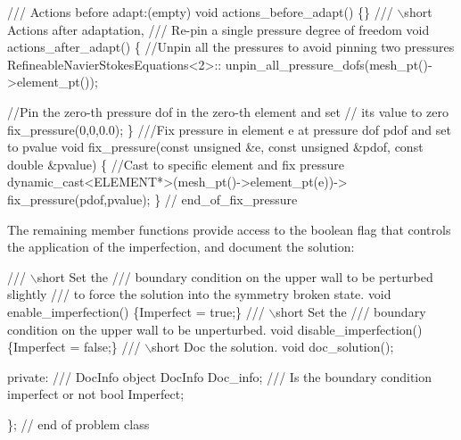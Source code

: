 \begin{DoxyCodeInclude}
\textcolor{comment}{}
\textcolor{comment}{ /// Actions before adapt:(empty)}
\textcolor{comment}{} \textcolor{keywordtype}{void} actions\_before\_adapt() \{\}
\textcolor{comment}{}
\textcolor{comment}{ /// \(\backslash\)short Actions after adaptation,}
\textcolor{comment}{ /// Re-pin a single pressure degree of freedom}
\textcolor{comment}{} \textcolor{keywordtype}{void} actions\_after\_adapt()
  \{
   \textcolor{comment}{//Unpin all the pressures to avoid pinning two pressures}
   RefineableNavierStokesEquations<2>::
    unpin\_all\_pressure\_dofs(mesh\_pt()->element\_pt());

   \textcolor{comment}{//Pin the zero-th pressure dof in the zero-th element and set}
   \textcolor{comment}{// its value to zero}
   fix\_pressure(0,0,0.0);
  \}
\textcolor{comment}{}
\textcolor{comment}{ ///Fix pressure in element e at pressure dof pdof and set to pvalue}
\textcolor{comment}{} \textcolor{keywordtype}{void} fix\_pressure(\textcolor{keyword}{const} \textcolor{keywordtype}{unsigned} &e, \textcolor{keyword}{const} \textcolor{keywordtype}{unsigned} &pdof, 
                   \textcolor{keyword}{const} \textcolor{keywordtype}{double} &pvalue)
  \{
   \textcolor{comment}{//Cast to specific element and fix pressure}
   \textcolor{keyword}{dynamic\_cast<}ELEMENT*\textcolor{keyword}{>}(mesh\_pt()->element\_pt(e))->
    fix\_pressure(pdof,pvalue);
  \} \textcolor{comment}{// end\_of\_fix\_pressure}

\end{DoxyCodeInclude}


The remaining member functions provide access to the boolean flag that controls the application of the imperfection, and document the solution\+:


\begin{DoxyCodeInclude}
\textcolor{comment}{}
\textcolor{comment}{ /// \(\backslash\)short Set the}
\textcolor{comment}{ /// boundary condition on the upper wall to be perturbed slightly}
\textcolor{comment}{ /// to force the solution into the symmetry broken state.}
\textcolor{comment}{} \textcolor{keywordtype}{void} enable\_imperfection() \{Imperfect = \textcolor{keyword}{true};\}
\textcolor{comment}{}
\textcolor{comment}{ /// \(\backslash\)short Set the}
\textcolor{comment}{ /// boundary condition on the upper wall to be unperturbed.}
\textcolor{comment}{} \textcolor{keywordtype}{void} disable\_imperfection() \{Imperfect = \textcolor{keyword}{false};\}
 \textcolor{comment}{}
\textcolor{comment}{ /// \(\backslash\)short Doc the solution.}
\textcolor{comment}{} \textcolor{keywordtype}{void} doc\_solution();
 
\textcolor{keyword}{private}:
 \textcolor{comment}{}
\textcolor{comment}{ /// DocInfo object}
\textcolor{comment}{} DocInfo Doc\_info;
 \textcolor{comment}{}
\textcolor{comment}{ /// Is the boundary condition imperfect or not}
\textcolor{comment}{} \textcolor{keywordtype}{bool} Imperfect;

\}; \textcolor{comment}{// end of problem class}

\end{DoxyCodeInclude}




